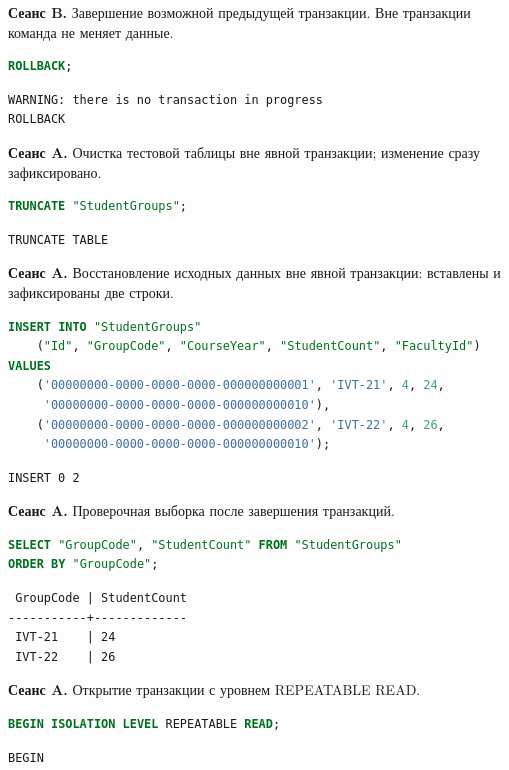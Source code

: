 \documentclass[12pt,a4paper]{article}
\begin{document}
\textbf{Сеанс B.} Завершение возможной предыдущей транзакции. Вне транзакции команда не меняет данные.
\begin{lstlisting}[language=SQL]
ROLLBACK;
\end{lstlisting}

\begin{lstlisting}
WARNING: there is no transaction in progress
ROLLBACK
\end{lstlisting}

\textbf{Сеанс A.} Очистка тестовой таблицы вне явной транзакции; изменение сразу зафиксировано.
\begin{lstlisting}[language=SQL]
TRUNCATE "StudentGroups";
\end{lstlisting}

\begin{lstlisting}
TRUNCATE TABLE
\end{lstlisting}

\textbf{Сеанс A.} Восстановление исходных данных вне явной транзакции: вставлены и зафиксированы две строки.
\begin{lstlisting}[language=SQL]
INSERT INTO "StudentGroups"
    ("Id", "GroupCode", "CourseYear", "StudentCount", "FacultyId")
VALUES
    ('00000000-0000-0000-0000-000000000001', 'IVT-21', 4, 24,
     '00000000-0000-0000-0000-000000000010'),
    ('00000000-0000-0000-0000-000000000002', 'IVT-22', 4, 26,
     '00000000-0000-0000-0000-000000000010');
\end{lstlisting}

\begin{lstlisting}
INSERT 0 2
\end{lstlisting}

\textbf{Сеанс A.} Проверочная выборка после завершения транзакций.
\begin{lstlisting}[language=SQL]
SELECT "GroupCode", "StudentCount" FROM "StudentGroups"
ORDER BY "GroupCode";
\end{lstlisting}

\begin{lstlisting}
 GroupCode | StudentCount
-----------+-------------
 IVT-21    | 24
 IVT-22    | 26
\end{lstlisting}

\textbf{Сеанс A.} Открытие транзакции с уровнем REPEATABLE READ.
\begin{lstlisting}[language=SQL]
BEGIN ISOLATION LEVEL REPEATABLE READ;
\end{lstlisting}

\begin{lstlisting}
BEGIN
\end{lstlisting}
\end{document}
